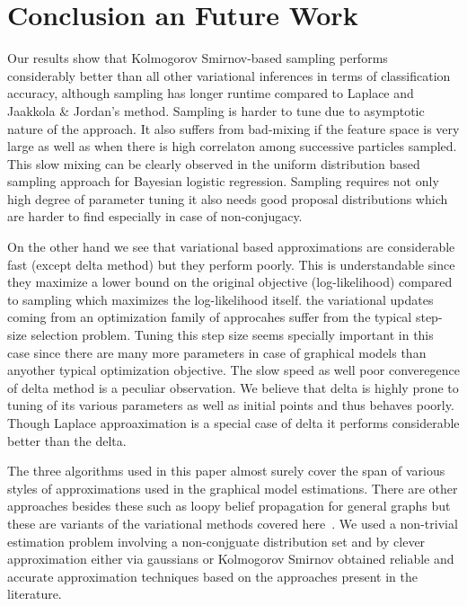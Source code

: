 
\section{Conclusion an Future Work}

Our results show that Kolmogorov Smirnov-based sampling performs considerably
better than all other variational inferences in terms of classification
accuracy, although sampling has longer runtime compared to Laplace and
Jaakkola \& Jordan's method. Sampling is harder to tune due to asymptotic nature of the
approach. It also suffers from bad-mixing if the feature space is very large
as well as when there is high correlaton among successive particles sampled.
This slow mixing can be clearly observed in the uniform distribution based
sampling approach for Bayesian logistic regression.  Sampling requires not
only high degree of parameter tuning it also needs good proposal distributions
which are harder to find especially in case of non-conjugacy. 

On the other hand we see that variational based approximations are considerable
fast (except delta method) but they perform poorly. This is understandable since
they maximize a lower bound on the original objective (log-likelihood) compared
to sampling which maximizes the log-likelihood itself. the variational updates
coming from an optimization family of approcahes suffer from the typical
step-size selection problem. Tuning this step size seems specially important in
this case since there are many more parameters in case of graphical models than
anyother typical optimization objective. The slow speed as well poor
converegence of delta method is a peculiar observation. We believe that delta is
highly prone to tuning of its various parameters as well as initial points and
thus behaves poorly. Though Laplace approaximation is a special case of delta it
performs considerable better than the delta. 

The three algorithms used in this paper almost surely cover the
span of various styles of approximations used in the graphical model
estimations. There are other approaches besides these such as
loopy belief propagation for general graphs but these are variants of the 
variational methods covered here~\cite{Heskes02}. We used a non-trivial
estimation problem involving a non-conjguate distribution set and by clever
approximation either via gaussians or Kolmogorov Smirnov obtained reliable and
accurate approximation techniques based on the approaches present in the
literature.

